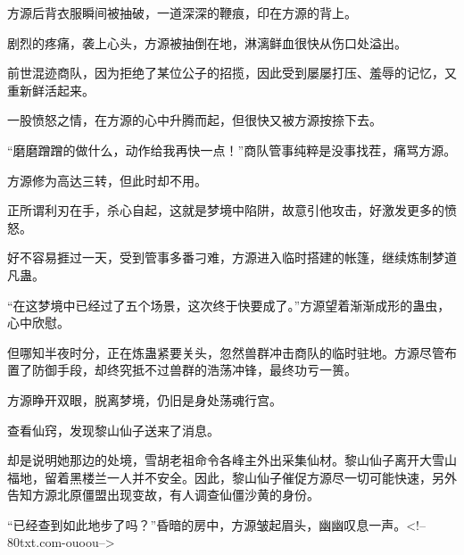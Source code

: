 \begin{this_body}
方源后背衣服瞬间被抽破，一道深深的鞭痕，印在方源的背上。

剧烈的疼痛，袭上心头，方源被抽倒在地，淋漓鲜血很快从伤口处溢出。

前世混迹商队，因为拒绝了某位公子的招揽，因此受到屡屡打压、羞辱的记忆，又重新鲜活起来。

一股愤怒之情，在方源的心中升腾而起，但很快又被方源按捺下去。

“磨磨蹭蹭的做什么，动作给我再快一点！”商队管事纯粹是没事找茬，痛骂方源。

方源修为高达三转，但此时却不用。

正所谓利刃在手，杀心自起，这就是梦境中陷阱，故意引他攻击，好激发更多的愤怒。

好不容易捱过一天，受到管事多番刁难，方源进入临时搭建的帐篷，继续炼制梦道凡蛊。

“在这梦境中已经过了五个场景，这次终于快要成了。”方源望着渐渐成形的蛊虫，心中欣慰。

但哪知半夜时分，正在炼蛊紧要关头，忽然兽群冲击商队的临时驻地。方源尽管布置了防御手段，却终究抵不过兽群的浩荡冲锋，最终功亏一篑。

方源睁开双眼，脱离梦境，仍旧是身处荡魂行宫。

查看仙窍，发现黎山仙子送来了消息。

却是说明她那边的处境，雪胡老祖命令各峰主外出采集仙材。黎山仙子离开大雪山福地，留着黑楼兰一人并不安全。因此，黎山仙子催促方源尽一切可能快速，另外告知方源北原僵盟出现变故，有人调查仙僵沙黄的身份。

“已经查到如此地步了吗？”昏暗的房中，方源皱起眉头，幽幽叹息一声。<!--80txt.com-ouoou-->

\end{this_body}

